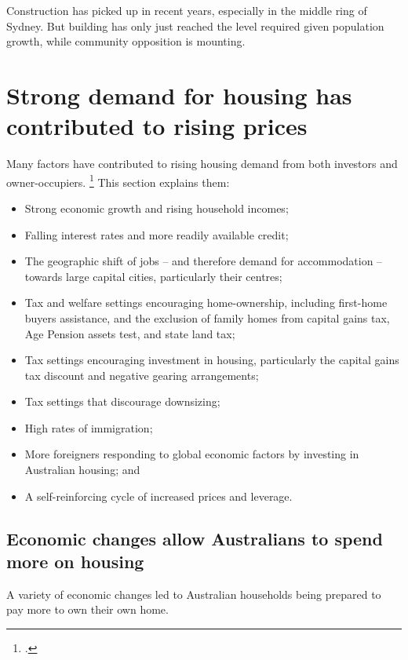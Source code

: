 Construction has picked up in recent years, especially in the middle ring of Sydney. But building has only just reached the level required given population growth, while community opposition is mounting.

\section{Strong demand for housing has contributed to rising prices }\label{sec:strong-demand-for-housing-has-contributed-to-rising-prices}

Many factors have contributed to rising housing demand from both investors and owner-occupiers.%
	\footcites{Yates}{ABSHousingFinanceAustraliaAugust2017}
This section explains them:

\begin{itemize}
\item
Strong economic growth and rising household incomes;
\item
Falling interest rates and more readily available credit;
\item
The geographic shift of jobs -- and therefore demand for accommodation -- towards large capital cities, particularly their centres;
\item
Tax and welfare settings encouraging home-ownership, including first-home buyers assistance, and the exclusion of family homes from capital gains tax, Age Pension assets test, and state land tax;
\item
Tax settings encouraging investment in housing, particularly the capital gains tax discount and negative gearing arrangements;
\item
Tax settings that discourage downsizing;
\item
High rates of immigration;
\item
More foreigners responding to global economic factors by investing in Australian housing; and
\item
A self-reinforcing cycle of increased prices and leverage.
\end{itemize}

\subsection{Economic changes allow Australians to spend more on housing }\label{subsec:economic-changes-allow-australians-to-spend-more-on-housing}

A variety of economic changes led to Australian households being prepared to pay more to own their own home.

